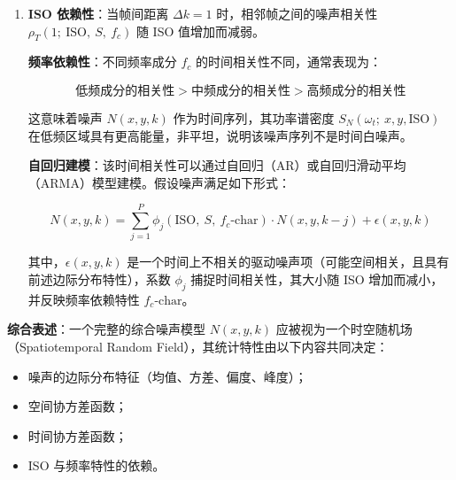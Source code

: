 \documentclass[a4paper]{article}
\begin{document}
\begin{enumerate}
			其中，时间间隔为 \( \Delta k = |k_1 - k_2| \)。若进一步用时间相关系数 \( \rho_T \) 表示，则可写为：

			\[
			R_N(\Delta k; x, y, \mathrm{ISO}) = \rho_T(\Delta k;\ \mathrm{ISO},\ S(x, y),\ f_c) \cdot \sigma_N(S(x, y, k_1), \ldots) \cdot \sigma_N(S(x, y, k_2), \ldots)
			\]

			若假设噪声过程在时间上是二阶平稳（second-order stationary），则噪声方差 \( \sigma_N \) 不依赖于具体帧号 \( k_1, k_2 \)，上述式子可简化为：

			\[
			R_N(\Delta k; x, y, \mathrm{ISO}) = \rho_T(\Delta k;\ \mathrm{ISO},\ S(x, y),\ f_c) \cdot \sigma_N^2(S(x, y),\ \mathrm{ISO},\ t)
			\]

			其中，\( f_c \) 表示可能与帧捕获频率或成像帧率相关的因素。
       
			\item \textbf{ISO 依赖性}：当帧间距离 \( \Delta k = 1 \) 时，相邻帧之间的噪声相关性 \( \rho_T(1;\ \mathrm{ISO},\ S,\ f_c) \) 随 ISO 值增加而减弱。

			\textbf{频率依赖性}：不同频率成分 \( f_c \) 的时间相关性不同，通常表现为：

			\[
			\text{低频成分的相关性} > \text{中频成分的相关性} > \text{高频成分的相关性}
			\]

			这意味着噪声 \( N(x, y, k) \) 作为时间序列，其功率谱密度 \( S_N(\omega_t;\ x, y, \mathrm{ISO}) \) 在低频区域具有更高能量，非平坦，说明该噪声序列不是时间白噪声。

			\textbf{自回归建模}：该时间相关性可以通过自回归（AR）或自回归滑动平均（ARMA）模型建模。假设噪声满足如下形式：

			\[
			N(x, y, k) = \sum_{j=1}^{P} \phi_j(\mathrm{ISO},\ S,\ f_c\text{-char}) \cdot N(x, y, k-j) + \epsilon(x, y, k)
			\]

			其中，\( \epsilon(x, y, k) \) 是一个时间上不相关的驱动噪声项（可能空间相关，且具有前述边际分布特性），系数 \( \phi_j \) 捕捉时间相关性，其大小随 ISO 增加而减小，并反映频率依赖特性 \( f_c\text{-char} \)。

			
		\end{enumerate}

			\textbf{综合表述}：一个完整的综合噪声模型 \( N(x, y, k) \) 应被视为一个时空随机场（Spatiotemporal Random Field），其统计特性由以下内容共同决定：

			\begin{itemize}
			\item 噪声的边际分布特征（均值、方差、偏度、峰度）；
			\item 空间协方差函数；
			\item 时间协方差函数；
			\item ISO 与频率特性的依赖。
			\end{itemize}
\end{document}
